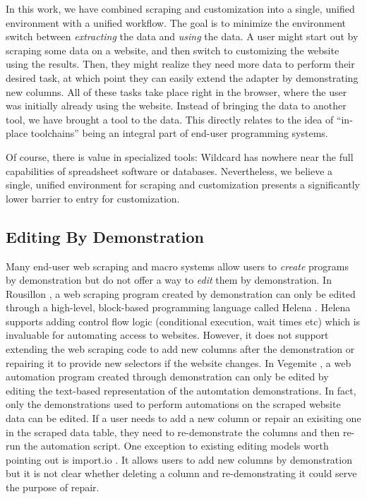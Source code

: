 \documentclass[sigconf,10pt]{acmart}
\begin{document}
In this work, we have combined scraping and customization into a single,
unified environment with a unified workflow. The goal is to minimize the
environment switch between \emph{extracting} the data and \emph{using}
the data. A user might start out by scraping some data on a website, and
then switch to customizing the website using the results. Then, they
might realize they need more data to perform their desired task, at
which point they can easily extend the adapter by demonstrating new
columns. All of these tasks take place right in the browser, where the
user was initially already using the website. Instead of bringing the
data to another tool, we have brought a tool to the data. This directly
relates to the idea of ``in-place toolchains'' \citep{zotero-60} being
an integral part of end-user programming systems.

Of course, there is value in specialized tools: Wildcard has nowhere
near the full capabilities of spreadsheet software or databases.
Nevertheless, we believe a single, unified environment for scraping and
customization presents a significantly lower barrier to entry for
customization.

\hypertarget{editing-by-demonstration-1}{%
\subsection{Editing By Demonstration}\label{editing-by-demonstration-1}}

Many end-user web scraping and macro systems allow users to
\emph{create} programs by demonstration but do not offer a way to
\emph{edit} them by demonstration. In Rousillon \citep{chasins2018}, a
web scraping program created by demonstration can only be edited through
a high-level, block-based programming language called Helena
\citep{zotero-51}. Helena supports adding control flow logic
(conditional execution, wait times etc) which is invaluable for
automating access to websites. However, it does not support extending
the web scraping code to add new columns after the demonstration or
repairing it to provide new selectors if the website changes. In
Vegemite \citep{lin2009}, a web automation program created through
demonstration can only be edited by editing the text-based
representation of the automtation demonstrations. In fact, only the
demonstrations used to perform automations on the scraped website data
can be edited. If a user needs to add a new column or repair an
exisiting one in the scraped data table, they need to re-demonstrate the
columns and then re-run the automation script. One exception to existing
editing models worth pointing out is import.io \citep{zotero-77}. It
allows users to add new columns by demonstration but it is not clear
whether deleting a column and re-demonstrating it could serve the
purpose of repair.
\end{document}
